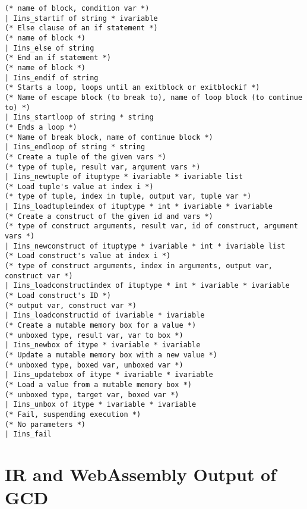\documentclass[12pt,twoside,notitlepage]{report}
\newcommand{\cfbox}[2]{%
	\colorlet{currentcolor}{.}%
	{\color{#1}%
		\fbox{\color{currentcolor}#2}}%
}
\newcommand\note[1]{\noindent\cfbox{blue}{\parbox{\textwidth}{\textcolor{blue}{#1}}}}
\begin{document}
\begin{verbatim}
(* name of block, condition var *)
| Iins_startif of string * ivariable
(* Else clause of an if statement *)
(* name of block *)
| Iins_else of string
(* End an if statement *)
(* name of block *)
| Iins_endif of string
(* Starts a loop, loops until an exitblock or exitblockif *)
(* Name of escape block (to break to), name of loop block (to continue to) *)
| Iins_startloop of string * string
(* Ends a loop *)
(* Name of break block, name of continue block *)
| Iins_endloop of string * string
(* Create a tuple of the given vars *)
(* type of tuple, result var, argument vars *)
| Iins_newtuple of ituptype * ivariable * ivariable list
(* Load tuple's value at index i *)
(* type of tuple, index in tuple, output var, tuple var *)
| Iins_loadtupleindex of ituptype * int * ivariable * ivariable
(* Create a construct of the given id and vars *)
(* type of construct arguments, result var, id of construct, argument vars *)
| Iins_newconstruct of ituptype * ivariable * int * ivariable list
(* Load construct's value at index i *)
(* type of construct arguments, index in arguments, output var, construct var *)
| Iins_loadconstructindex of ituptype * int * ivariable * ivariable
(* Load construct's ID *)
(* output var, construct var *)
| Iins_loadconstructid of ivariable * ivariable
(* Create a mutable memory box for a value *)
(* unboxed type, result var, var to box *)
| Iins_newbox of itype * ivariable * ivariable
(* Update a mutable memory box with a new value *)
(* unboxed type, boxed var, unboxed var *)
| Iins_updatebox of itype * ivariable * ivariable
(* Load a value from a mutable memory box *)
(* unboxed type, target var, boxed var *)
| Iins_unbox of itype * ivariable * ivariable
(* Fail, suspending execution *)
(* No parameters *)
| Iins_fail
\end{verbatim}

\clearpage
\chapter{IR and WebAssembly Output of GCD}
\note{Tobias' proposal that I have an example program and show it at each step of the compilation. Could be a good idea but the code is massive, so this would easily extend to about 10+ pages. Also might require renaming some of the temporaries to make the code easier to read}
\note{Probably a bit much coming to think of it, so maybe just GCD sample, (untyped-AST?), IR and WebAssembly only to save from having to apply to the chairman of examiners for a longer appendix. I would rename temp variables to make the code easier to understand}
\end{document}
